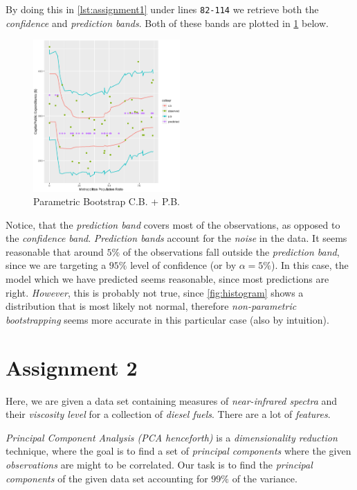 \documentclass[a4paper, twocolumn]{article}
\begin{document}
        By doing this in \cref{lst:assignment1} under lines \verb|82-114| we retrieve both the \emph{confidence} and \emph{prediction bands}. Both of these bands are plotted in \cref{fig:pbands} below.

        \begin{figure}[h!]
            \centering
            \caption{Parametric Bootstrap C.B. + P.B.}
            \label{fig:pbands}
            \includegraphics[width=0.5\textwidth]{share/pbands.eps}
        \end{figure}

        Notice, that the \emph{prediction band} covers most of the observations, as opposed to the \emph{confidence band}. \emph{Prediction bands} account for the \emph{noise} in the data. It seems reasonable that around \(5 \%\) of the observations fall outside the \emph{prediction band}, since we are targeting a \(95 \%\) level of confidence (or by \(\alpha = 5 \%\)). In this case, the model which we have predicted seems reasonable, since most predictions are right. \emph{However}, this is probably not true, since \cref{fig:histogram} shows a distribution that is most likely not normal, therefore \emph{non-parametric bootstrapping} seems more accurate in this particular case (also by intuition).

    \section*{Assignment 2}

        Here, we are given a data set containing measures of \emph{near-infrared spectra} and their \emph{viscosity level} for a collection of \emph{diesel fuels}. There are a lot of \emph{features}.

        \emph{Principal Component Analysis (PCA henceforth)} is a \emph{dimensionality reduction} technique, where the goal is to find a set of \emph{principal components} where the given \emph{observations} are might to be correlated. Our task is to find the \emph{principal components} of the given data set accounting for \(99 \%\) of the variance.
\end{document}
